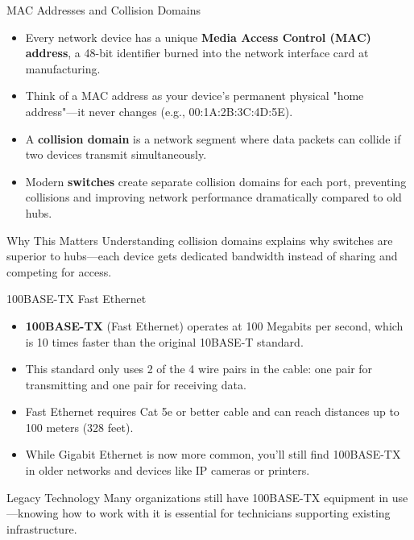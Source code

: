 \documentclass[aspectratio=169]{beamer}
\begin{document}
\begin{frame}{MAC Addresses and Collision Domains}
    \begin{itemize}
        \item Every network device has a unique \textbf{Media Access Control (MAC) address}, a 48-bit identifier burned into the network interface card at manufacturing.
        \item Think of a MAC address as your device's permanent physical "home address"---it never changes (e.g., 00:1A:2B:3C:4D:5E).
        \item A \textbf{collision domain} is a network segment where data packets can collide if two devices transmit simultaneously.
        \item Modern \textbf{switches} create separate collision domains for each port, preventing collisions and improving network performance dramatically compared to old hubs.
    \end{itemize}
    
    \vspace{0.3cm}
    \begin{block}{Why This Matters}
        Understanding collision domains explains why switches are superior to hubs---each device gets dedicated bandwidth instead of sharing and competing for access.
    \end{block}
\end{frame}

\begin{frame}{100BASE-TX Fast Ethernet}
    \begin{itemize}
        \item \textbf{100BASE-TX} (Fast Ethernet) operates at 100 Megabits per second, which is 10 times faster than the original 10BASE-T standard.
        \item This standard only uses 2 of the 4 wire pairs in the cable: one pair for transmitting and one pair for receiving data.
        \item Fast Ethernet requires Cat 5e or better cable and can reach distances up to 100 meters (328 feet).
        \item While Gigabit Ethernet is now more common, you'll still find 100BASE-TX in older networks and devices like IP cameras or printers.
    \end{itemize}
    
    \vspace{0.3cm}
    \begin{alertblock}{Legacy Technology}
        Many organizations still have 100BASE-TX equipment in use---knowing how to work with it is essential for technicians supporting existing infrastructure.
    \end{alertblock}
\end{frame}
\end{document}
